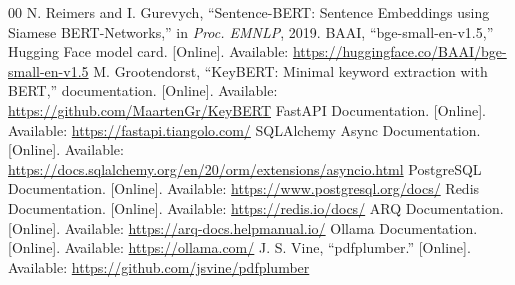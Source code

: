 \documentclass[conference]{IEEEtran}
\begin{document}
\begin{thebibliography}{00}
 N. Reimers and I. Gurevych, ``Sentence-BERT: Sentence Embeddings using Siamese BERT-Networks,'' in \emph{Proc. EMNLP}, 2019.
 BAAI, ``bge-small-en-v1.5,'' Hugging Face model card. [Online]. Available: \url{https://huggingface.co/BAAI/bge-small-en-v1.5}
 M. Grootendorst, ``KeyBERT: Minimal keyword extraction with BERT,'' documentation. [Online]. Available: \url{https://github.com/MaartenGr/KeyBERT}
 FastAPI Documentation. [Online]. Available: \url{https://fastapi.tiangolo.com/}
 SQLAlchemy Async Documentation. [Online]. Available: \url{https://docs.sqlalchemy.org/en/20/orm/extensions/asyncio.html}
 PostgreSQL Documentation. [Online]. Available: \url{https://www.postgresql.org/docs/}
 Redis Documentation. [Online]. Available: \url{https://redis.io/docs/}
 ARQ Documentation. [Online]. Available: \url{https://arq-docs.helpmanual.io/}
 Ollama Documentation. [Online]. Available: \url{https://ollama.com/}
 J. S. Vine, ``pdfplumber.'' [Online]. Available: \url{https://github.com/jsvine/pdfplumber}
\end{thebibliography}
\end{document}
